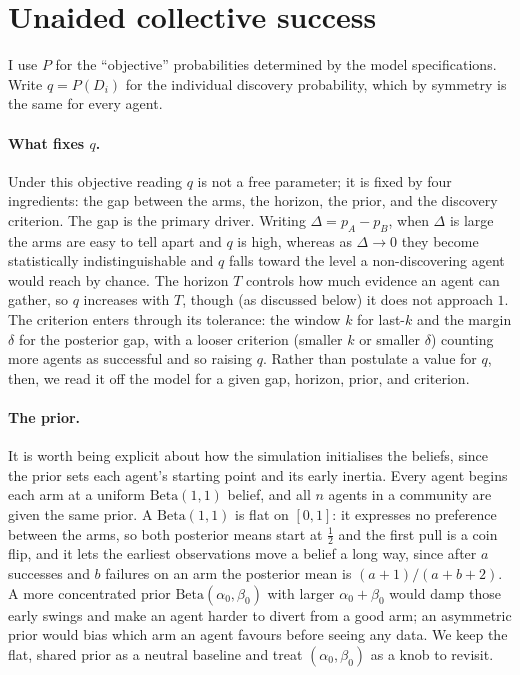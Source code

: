\documentclass[12pt]{article}
\begin{document}
\section{Unaided collective success}
\label{sec:unaided}

I use $P$ for the ``objective'' probabilities determined by the model specifications. Write $q = P(D_i)$ for the individual discovery probability, which by symmetry is the same for every agent.

\paragraph{What fixes $q$.}
Under this objective reading $q$ is not a free parameter; it is fixed by four ingredients: the gap between the arms, the horizon, the prior, and the discovery criterion. The gap is the primary driver. Writing $\Delta = p_A - p_B$, when $\Delta$ is large the arms are easy to tell apart and $q$ is high, whereas as $\Delta \to 0$ they become statistically indistinguishable and $q$ falls toward the level a non-discovering agent would reach by chance. The horizon $T$ controls how much evidence an agent can gather, so $q$ increases with $T$, though (as discussed below) it does not approach $1$. The criterion enters through its tolerance: the window $k$ for last-$k$ and the margin $\delta$ for the posterior gap, with a looser criterion (smaller $k$ or smaller $\delta$) counting more agents as successful and so raising $q$. Rather than postulate a value for $q$, then, we read it off the model for a given gap, horizon, prior, and criterion.

\paragraph{The prior.}
It is worth being explicit about how the simulation initialises the beliefs, since the prior sets each agent's starting point and its early inertia. Every agent begins each arm at a uniform $\mathrm{Beta}(1,1)$ belief, and all $n$ agents in a community are given the same prior. A $\mathrm{Beta}(1,1)$ is flat on $[0,1]$: it expresses no preference between the arms, so both posterior means start at $\tfrac12$ and the first pull is a coin flip, and it lets the earliest observations move a belief a long way, since after $a$ successes and $b$ failures on an arm the posterior mean is $(a+1)/(a+b+2)$. A more concentrated prior $\mathrm{Beta}(\alpha_0,\beta_0)$ with larger $\alpha_0+\beta_0$ would damp those early swings and make an agent harder to divert from a good arm; an asymmetric prior would bias which arm an agent favours before seeing any data. We keep the flat, shared prior as a neutral baseline and treat $(\alpha_0,\beta_0)$ as a knob to revisit.
\end{document}
